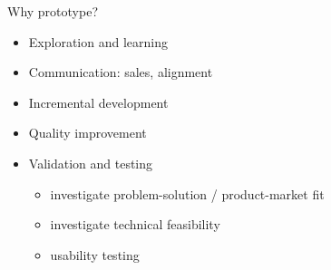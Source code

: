 \begin{Slide}{Why prototype?}
\begin{itemize}
\item Exploration and learning
\item Communication: sales, alignment
\item Incremental development
\item Quality improvement
\item Validation and testing
\begin{itemize}
\item investigate problem-solution / product-market fit
\item investigate technical feasibility
\item usability testing


\end{itemize}
\end{itemize}
\end{Slide}